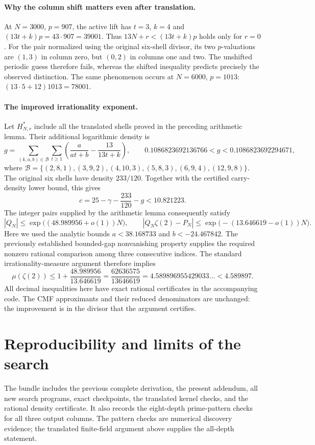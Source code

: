 \documentclass[11pt]{article}
\begin{document}
\paragraph{Why the column shift matters even after translation.}
At $N=3000$, $p=907$, the active lift has $t=3$, $k=4$ and
$(13t+k)p=43\cdot907=39001$.
Thus $13N+r<(13t+k)p$ holds only for $r=0$.
For the pair normalized using the original six-shell divisor, its two
$p$-valuations are $(1,3)$ in column zero, but $(0,2)$ in columns one and
two. The unshifted periodic guess therefore fails, whereas the shifted
inequality predicts precisely the observed distinction.
The same phenomenon occurs at $N=6000$, $p=1013$:
$(13\cdot5+12)1013=78001$.
\paragraph{The improved irrationality exponent.}
Let $H^*_{N,r}$ include all the translated shells proved in the
preceding arithmetic lemma. Their additional logarithmic density is
\[
 g=\sum_{(k,a,b)\in\mathcal B}\sum_{t\ge1}
 \left(\frac{a}{at+b}-\frac{13}{13t+k}\right),\qquad
 0.1086823692136766<g<0.1086823692294671,
\]
where
$\mathcal B=\{(2,8,1),(3,9,2),(4,10,3),(5,8,3),(6,9,4),(12,9,8)\}$.
The original six shells have density $233/120$. Together with the certified
carry-density lower bound, this gives
\[
 c=25-\gamma-\frac{233}{120}-g<10.821223.
\]
The integer pairs supplied by the arithmetic lemma consequently satisfy
\[
 |Q_N|\le\exp\bigl((48.989956+o(1))N\bigr),\qquad
 |Q_N\zeta(2)-P_N|
       \le\exp\bigl(-(13.646619-o(1))N\bigr).
\]
Here we used the analytic bounds $a<38.168733$ and
$b<-24.467842$. The previously established bounded-gap nonvanishing
property supplies the required nonzero rational comparison among three
consecutive indices. The standard irrationality-measure argument therefore
implies
\[
 \boxed{\mu(\zeta(2))\le
  1+\frac{48.989956}{13.646619}
  =\frac{62636575}{13646619}
  =4.589896955429033\ldots<4.589897.}
\]
All decimal inequalities here have exact rational certificates in the
accompanying code. The CMF approximants and their reduced denominators are
unchanged: the improvement is in the divisor that the argument certifies.

\section{Reproducibility and limits of the search}
The bundle includes the previous complete derivation, the present
addendum, all new search programs, exact checkpoints, the translated
kernel checks, and the rational density certificate. It also records
the eight-depth prime-pattern checks for all three output columns.
The pattern checks are numerical discovery evidence; the translated
finite-field argument above supplies the all-depth statement.
\end{document}
